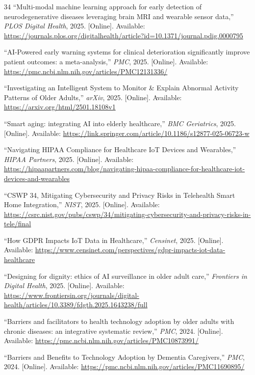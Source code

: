 \documentclass[conference]{IEEEtran}
\begin{document}
\begin{thebibliography}{34}
``Multi-modal machine learning approach for early detection of neurodegenerative diseases leveraging brain MRI and wearable sensor data,'' \textit{PLOS Digital Health}, 2025. [Online]. Available: \url{https://journals.plos.org/digitalhealth/article?id=10.1371/journal.pdig.0000795}

``AI-Powered early warning systems for clinical deterioration significantly improve patient outcomes: a meta-analysis,'' \textit{PMC}, 2025. [Online]. Available: \url{https://pmc.ncbi.nlm.nih.gov/articles/PMC12131336/}

``Investigating an Intelligent System to Monitor \& Explain Abnormal Activity Patterns of Older Adults,'' \textit{arXiv}, 2025. [Online]. Available: \url{https://arxiv.org/html/2501.18108v1}

``Smart aging: integrating AI into elderly healthcare,'' \textit{BMC Geriatrics}, 2025. [Online]. Available: \url{https://link.springer.com/article/10.1186/s12877-025-06723-w}

``Navigating HIPAA Compliance for Healthcare IoT Devices and Wearables,'' \textit{HIPAA Partners}, 2025. [Online]. Available: \url{https://hipaapartners.com/blog/navigating-hipaa-compliance-for-healthcare-iot-devices-and-wearables}

``CSWP 34, Mitigating Cybersecurity and Privacy Risks in Telehealth Smart Home Integration,'' \textit{NIST}, 2025. [Online]. Available: \url{https://csrc.nist.gov/pubs/cswp/34/mitigating-cybersecurity-and-privacy-risks-in-tele/final}

``How GDPR Impacts IoT Data in Healthcare,'' \textit{Censinet}, 2025. [Online]. Available: \url{https://www.censinet.com/perspectives/gdpr-impacts-iot-data-healthcare}

``Designing for dignity: ethics of AI surveillance in older adult care,'' \textit{Frontiers in Digital Health}, 2025. [Online]. Available: \url{https://www.frontiersin.org/journals/digital-health/articles/10.3389/fdgth.2025.1643238/full}

``Barriers and facilitators to health technology adoption by older adults with chronic diseases: an integrative systematic review,'' \textit{PMC}, 2024. [Online]. Available: \url{https://pmc.ncbi.nlm.nih.gov/articles/PMC10873991/}

``Barriers and Benefits to Technology Adoption by Dementia Caregivers,'' \textit{PMC}, 2024. [Online]. Available: \url{https://pmc.ncbi.nlm.nih.gov/articles/PMC11690895/}


\end{thebibliography}
\end{document}
